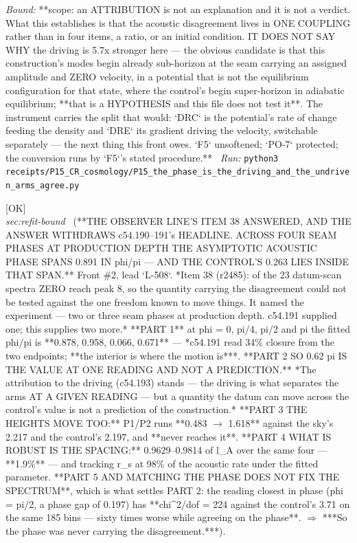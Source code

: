 \begin{description}
 \emph{Bound:} **scope: an ATTRIBUTION is not an explanation and it is not a verdict. What this establishes is that the acoustic disagreement lives in ONE COUPLING rather than in four items, a ratio, or an initial condition. IT DOES NOT SAY WHY the driving is 5.7x stronger here --- the obvious candidate is that this construction's modes begin already sub-horizon at the seam carrying an assigned amplitude and ZERO velocity, in a potential that is not the equilibrium configuration for that state, where the control's begin super-horizon in adiabatic equilibrium; **that is a HYPOTHESIS and this file does not test it**. The instrument carries the split that would: `DRC` is the potential's rate of change feeding the density and `DRE` its gradient driving the velocity, switchable separately --- the next thing this front owes. `F5` unsoftened; `PO-7` protected; the conversion runs by `F5`'s stated procedure.**
\ \emph{Run:} \texttt{python3 receipts/P15\_CR\_cosmology/P15\_the\_phase\_is\_the\_driving\_and\_the\_undriven\_arms\_agree.py}
\item[\label{rcpt:P15_the_phase_moves_with_the_datum_and_only_the_spacing_does_not}\texttt{P15\_the\_phase\_moves\_with\_the\_datum\_and\_only\_the\_spacing\_does\_not}]\hfill\textsf{[OK]}\\
\textit{sec:refit-bound} \ (**THE OBSERVER LINE'S ITEM 38 ANSWERED, AND THE ANSWER WITHDRAWS c54.190--191's HEADLINE. ACROSS FOUR SEAM PHASES AT PRODUCTION DEPTH THE ASYMPTOTIC ACOUSTIC PHASE SPANS 0.891 IN phi/pi --- AND THE CONTROL'S 0.263 LIES INSIDE THAT SPAN.** Front \#2, lead `L-508`. *Item 38 (r2485): of the 23 datum-scan spectra ZERO reach peak 8, so the quantity carrying the disagreement could not be tested against the one freedom known to move things. It named the experiment --- two or three seam phases at production depth. c54.191 supplied one; this supplies two more.* **PART 1** at phi = 0, pi/4, pi/2 and pi the fitted phi/pi is **0.878, 0.958, 0.066, 0.671** --- *c54.191 read 34\% closure from the two endpoints; **the interior is where the motion is***. **PART 2 SO 0.62 pi IS THE VALUE AT ONE READING AND NOT A PREDICTION.** *The attribution to the driving (c54.193) stands --- the driving is what separates the arms AT A GIVEN READING --- but a quantity the datum can move across the control's value is not a prediction of the construction.* **PART 3 THE HEIGHTS MOVE TOO:** P1/P2 runs **0.483 \ensuremath{\to} 1.618** against the sky's 2.217 and the control's 2.197, and **never reaches it**. **PART 4 WHAT IS ROBUST IS THE SPACING:** 0.9629--0.9814 of l\_A over the same four --- **1.9\%** --- and tracking r\_s at 98\% of the acoustic rate under the fitted parameter. **PART 5 AND MATCHING THE PHASE DOES NOT FIX THE SPECTRUM**, which is what settles PART 2: the reading closest in phase (phi = pi/2, a phase gap of 0.197) has **chi\textasciicircum{}2/dof = 224 against the control's 3.71 on the same 185 bins --- sixty times worse while agreeing on the phase**. \ensuremath{\Rightarrow} ***So the phase was never carrying the disagreement.***). 

\end{description}
